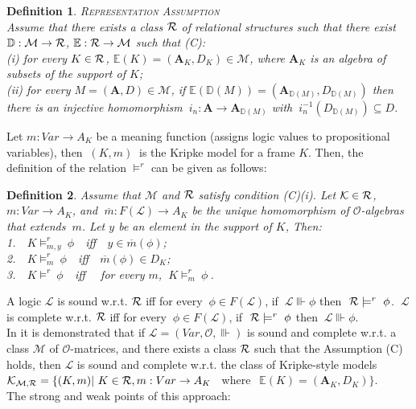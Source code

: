 \documentclass[10pt,twocolumn]{article}
\newcommand{\K}{\mathcal{K}} \renewcommand{\L}{\mathcal{L}}
\newcommand{\M}{\mathcal{M}} \newcommand{\N}{\mathcal{N}}
\renewcommand{\O}{\mathcal{O}} \renewcommand{\P}{\mathcal{P}}
\newtheorem{definition}{Definition}
\begin{document}
\begin{definition} \textsc{Representation Assumption \cite{Sofr03}} \label{def:abs}\\
Assume that there exists a class $\mathcal{R}$ of relational structures such
that there exist $\mathbb{D}:\M \rightarrow\R$, $\mathbb{E}:\R
\rightarrow \M$ such that (C):\\
(i)  for every $K \in \mathcal{R}$, $\mathbb{E}(K) = (\textbf{A}_K, D_K) \in
\M$, where $\textbf{A}_K$ is an algebra of subsets of the support of
$K$;\\
(ii) for every $M = (\textbf{A},D) \in \M$, if
$\mathbb{E}(\mathbb{D}(M)) = (\textbf{A}_{\mathbb{D}(M)},
D_{\mathbb{D}(M)})$ then there is an injective homomorphism
$~i_n:\textbf{A} \rightarrow \textbf{A}_{\mathbb{D}(M)}$ with
$~i_n^{-1}(D_{\mathbb{D}(M)}) \subseteq D$.
\end{definition}
Let $m:Var \rightarrow A_K$ be a meaning function (assigns logic
values to propositional variables), then $~(K,m)~$ is the Kripke
model for a frame $K$. Then, the definition of the relation
$\models^r$ can be given as follows:
\begin{definition} \cite{Sofr03} Assume that $\M$ and $\mathcal{R}$ satisfy
condition (C)(i). Let $\K \in \R$,  $m:Var \rightarrow A_K$, and
$~\overline{m}:F(\L) \rightarrow A_K$ be the unique homomorphism of
$\O$-algebras that extends $~m$. Let $y$ be an element in the
support of $K$, Then:\\
1. $~~~K \models^r_{m,y}~\phi~~~$ iff  $~~~y \in
\overline{m}(\phi)$;\\
2. $~~~K \models^r_{m}~\phi~~~$ iff  $~~~\overline{m}(\phi) \in
D_K$;\\
3. $~~~K \models^r~\phi~~~$ iff  $~~~$ for every
$m$, $~K \models^r_{m}~\phi~$.
\end{definition}
A logic $\L$ is sound w.r.t. $\mathcal{R}$ iff for every $~\phi \in F(\L)$,
if $~\L \Vvdash \phi$ then $~\mathcal{R} \models^r~\phi$. $~\L$ is complete
w.r.t. $\mathcal{R}$ iff for every  $~\phi \in F(\L)$, if $~\mathcal{R}
\models^r~\phi$ then $~\L \Vvdash \phi$.\\
In \cite{Sofr03} it is demonstrated that if $\L = (Var, \O,
\Vvdash)$ is sound and complete w.r.t. a class $\M$ of
$\O$-matrices, and there exists a class $\mathcal{R}$ such that the
Assumption (C) holds, then $\L$ is sound and complete w.r.t. the
class of Kripke-style models $\K_{\M, \R} = \{(K,m)|~K \in \R, m:Var
\rightarrow A_K$
 $~$ where $ ~~\mathbb{E}(K) = (\textbf{A}_K,D_K) \}$.
\\The strong and weak points of this approach:
\end{document}
